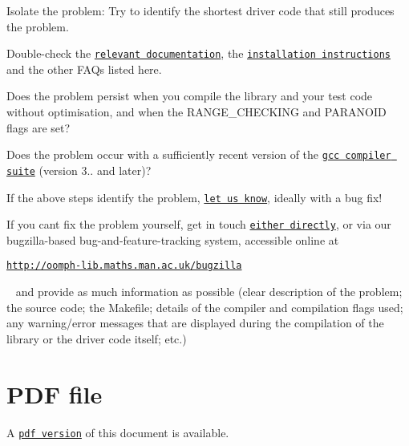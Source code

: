 \begin{DoxyEnumerate}
\item Isolate the problem\+: Try to identify the shortest driver code that still produces the problem.~\newline
~\newline

\item Double-\/check the \href{../../the_data_structure/html/index.html}{\tt relevant documentation}, the \href{../../the_distribution/html/index.html}{\tt installation instructions} and the other F\+A\+Qs listed here.~\newline
~\newline

\item Does the problem persist when you compile the library and your test code without optimisation, and when the {\ttfamily R\+A\+N\+G\+E\+\_\+\+C\+H\+E\+C\+K\+I\+NG} and {\ttfamily P\+A\+R\+A\+N\+O\+ID} flags are set? ~\newline
~\newline

\item Does the problem occur with a sufficiently recent version of the \href{http://gcc.gnu.org/}{\tt gcc compiler suite} (version 3.. and later)?~\newline
~\newline

\item If the above steps identify the problem, \href{../../contact/html/index.html}{\tt let us know}, ideally with a bug fix! ~\newline
~\newline

\item If you can\textquotesingle{}t fix the problem yourself, get in touch \href{../../contact/html/index.html}{\tt either directly}, or via our bugzilla-\/based bug-\/and-\/feature-\/tracking system, accessible online at ~\newline
~\newline
 \begin{center} \href{http://oomph-lib.maths.man.ac.uk/bugzilla}{\tt http\+://oomph-\/lib.\+maths.\+man.\+ac.\+uk/bugzilla} \end{center}  ~\newline
 and provide as much information as possible (clear description of the problem; the source code; the Makefile; details of the compiler and compilation flags used; any warning/error messages that are displayed during the compilation of the library or the driver code itself; etc.) ~\newline
~\newline

\end{DoxyEnumerate}



 

 \hypertarget{index_pdf}{}\section{P\+D\+F file}\label{index_pdf}
A \href{../latex/refman.pdf}{\tt pdf version} of this document is available. 
